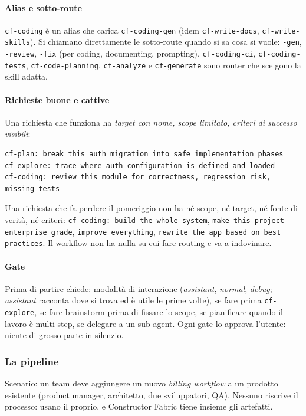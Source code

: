\documentclass[a4paper,12pt]{article}
\begin{document}
\paragraph{Alias e sotto-route} \texttt{cf-coding} è un alias che carica
\texttt{cf-coding-gen} (idem \texttt{cf-write-docs}, \texttt{cf-write-skills}). Si
chiamano direttamente le sotto-route quando si sa cosa si vuole: \texttt{-gen},
\texttt{-review}, \texttt{-fix} (per coding, documenting, prompting),
\texttt{cf-coding-ci}, \texttt{cf-coding-tests}, \texttt{cf-code-planning}.
\texttt{cf-analyze} e \texttt{cf-generate} sono router che scelgono la skill adatta.

\paragraph{Richieste buone e cattive}
Una richiesta che funziona ha \emph{target con nome, scope limitato, criteri di successo
visibili}:
\begin{verbatim}
cf-plan: break this auth migration into safe implementation phases
cf-explore: trace where auth configuration is defined and loaded
cf-coding: review this module for correctness, regression risk, missing tests
\end{verbatim}
Una richiesta che fa perdere il pomeriggio non ha né scope, né target, né fonte di
verità, né criteri: \texttt{cf-coding: build the whole system}, \texttt{make this project
enterprise grade}, \texttt{improve everything}, \texttt{rewrite the app based on best
practices}. Il workflow non ha nulla su cui fare routing e va a indovinare.

\paragraph{Gate} Prima di partire chiede: modalità di interazione (\emph{assistant},
\emph{normal}, \emph{debug}; \emph{assistant} racconta dove si trova ed è utile le prime
volte), se fare prima \texttt{cf-explore}, se fare brainstorm prima di fissare lo scope,
se pianificare quando il lavoro è multi-step, se delegare a un sub-agent. Ogni gate lo
approva l'utente: niente di grosso parte in silenzio.

\subsubsection{La pipeline}

Scenario: un team deve aggiungere un nuovo \emph{billing workflow} a un prodotto
esistente (product manager, architetto, due sviluppatori, QA). Nessuno riscrive il
processo: usano il proprio, e Constructor Fabric tiene insieme gli artefatti.
\end{document}
